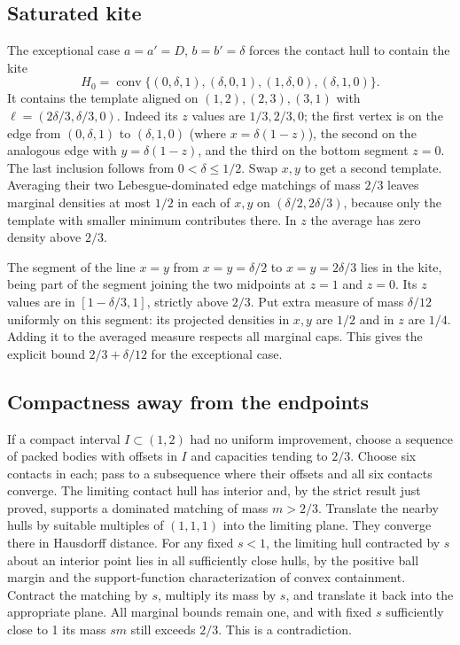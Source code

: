 \documentclass[
  10pt,
]{article}
\begin{document}
\subsection{Saturated kite}\label{saturated-kite}

The exceptional case \(a=a'=D\), \(b=b'=\delta\) forces the contact hull
to contain the kite \[
 H_0=\operatorname{conv}\{(0,\delta,1),(\delta,0,1),(1,\delta,0),(\delta,1,0)\}.
\] It contains the template aligned on \((1,2),(2,3),(3,1)\) with
\(\ell=(2\delta/3,\delta/3,0)\). Indeed its \(z\) values are
\(1/3,2/3,0\); the first vertex is on the edge from \((0,\delta,1)\) to
\((\delta,1,0)\) (where \(x=\delta(1-z)\)), the second on the analogous
edge with \(y=\delta(1-z)\), and the third on the bottom segment
\(z=0\). The last inclusion follows from \(0<\delta\le1/2\). Swap
\(x,y\) to get a second template. Averaging their two Lebesgue-dominated
edge matchings of mass \(2/3\) leaves marginal densities at most \(1/2\)
in each of \(x,y\) on \((\delta/2,2\delta/3)\), because only the
template with smaller minimum contributes there. In \(z\) the average
has zero density above \(2/3\).

The segment of the line \(x=y\) from \(x=y=\delta/2\) to
\(x=y=2\delta/3\) lies in the kite, being part of the segment joining
the two midpoints at \(z=1\) and \(z=0\). Its \(z\) values are in
\([1-\delta/3,1]\), strictly above \(2/3\). Put extra measure of mass
\(\delta/12\) uniformly on this segment: its projected densities in
\(x,y\) are \(1/2\) and in \(z\) are \(1/4\). Adding it to the averaged
measure respects all marginal caps. This gives the explicit bound
\(2/3+\delta/12\) for the exceptional case.

\subsection{Compactness away from the
endpoints}\label{compactness-away-from-the-endpoints}

If a compact interval \(I\subset(1,2)\) had no uniform improvement,
choose a sequence of packed bodies with offsets in \(I\) and capacities
tending to \(2/3\). Choose six contacts in each; pass to a subsequence
where their offsets and all six contacts converge. The limiting contact
hull has interior and, by the strict result just proved, supports a
dominated matching of mass \(m>2/3\). Translate the nearby hulls by
suitable multiples of \((1,1,1)\) into the limiting plane. They converge
there in Hausdorff distance. For any fixed \(s<1\), the limiting hull
contracted by \(s\) about an interior point lies in all sufficiently
close hulls, by the positive ball margin and the support-function
characterization of convex containment. Contract the matching by \(s\),
multiply its mass by \(s\), and translate it back into the appropriate
plane. All marginal bounds remain one, and with fixed \(s\) sufficiently
close to 1 its mass \(sm\) still exceeds \(2/3\). This is a
contradiction.
\end{document}
